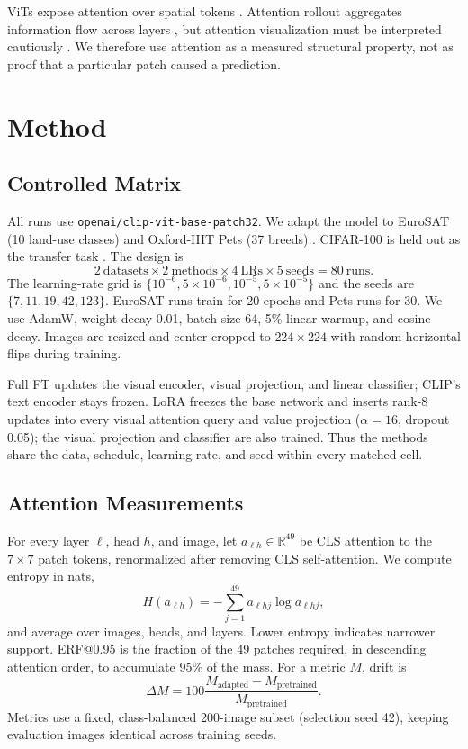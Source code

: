 \documentclass[conference]{IEEEtran}
\begin{document}
ViTs expose attention over spatial tokens \cite{dosovitskiy2021image}. Attention rollout aggregates information flow across layers \cite{abnar2020quantifying}, but attention visualization must be interpreted cautiously \cite{jain2019attention,wiegreffe2019attention}. We therefore use attention as a measured structural property, not as proof that a particular patch caused a prediction.

\section{Method}
\subsection{Controlled Matrix}
All runs use \texttt{openai/clip-vit-base-patch32}. We adapt the model to EuroSAT (10 land-use classes) \cite{helber2019eurosat} and Oxford-IIIT Pets (37 breeds) \cite{parkhi2012cats}. CIFAR-100 is held out as the transfer task \cite{krizhevsky2009learning}. The design is
\begin{equation}
2\ \text{datasets}\times2\ \text{methods}\times4\ \text{LRs}\times5\ \text{seeds}=80\ \text{runs}.
\end{equation}
The learning-rate grid is $\{10^{-6},5\times10^{-6},10^{-5},5\times10^{-5}\}$ and the seeds are $\{7,11,19,42,123\}$. EuroSAT runs train for 20 epochs and Pets runs for 30. We use AdamW, weight decay 0.01, batch size 64, 5\% linear warmup, and cosine decay. Images are resized and center-cropped to $224\times224$ with random horizontal flips during training.

Full FT updates the visual encoder, visual projection, and linear classifier; CLIP's text encoder stays frozen. LoRA freezes the base network and inserts rank-8 updates into every visual attention query and value projection ($\alpha=16$, dropout 0.05); the visual projection and classifier are also trained. Thus the methods share the data, schedule, learning rate, and seed within every matched cell.

\subsection{Attention Measurements}
For every layer $\ell$, head $h$, and image, let $a_{\ell h}\in\mathbb{R}^{49}$ be CLS attention to the $7\times7$ patch tokens, renormalized after removing CLS self-attention. We compute entropy in nats,
\begin{equation}
H(a_{\ell h})=-\sum_{j=1}^{49}a_{\ell hj}\log a_{\ell hj},
\end{equation}
and average over images, heads, and layers. Lower entropy indicates narrower support. ERF@0.95 is the fraction of the 49 patches required, in descending attention order, to accumulate 95\% of the mass. For a metric $M$, drift is
\begin{equation}
\Delta M=100\frac{M_{\mathrm{adapted}}-M_{\mathrm{pretrained}}}{M_{\mathrm{pretrained}}}.
\end{equation}
Metrics use a fixed, class-balanced 200-image subset (selection seed 42), keeping evaluation images identical across training seeds.
\end{document}
